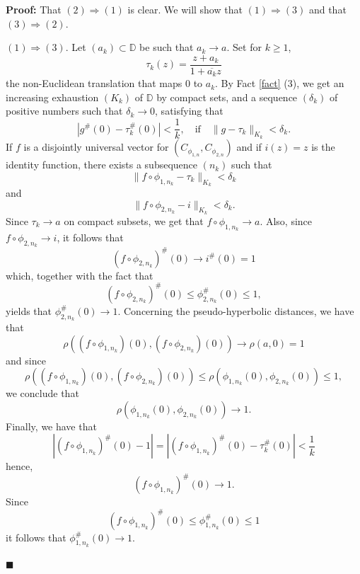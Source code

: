 \documentclass[12pt,a4paper]{amsart}
\theoremstyle{plain}
\theoremstyle{definition}
\theoremstyle{remark}
\theoremstyle{fact}
\newenvironment{pf}
{\noindent\textbf{Proof:}}
{\hfill $\blacksquare$\par\medskip}
\begin{document}
   
    \begin{pf}
        That $(2)\Rightarrow (1)$ is clear. We will show that $(1)\Rightarrow (3)$ and that $(3)\Rightarrow (2)$.

        $(1) \Rightarrow (3)$. Let $(a_k)\subset \mathbb{D}$ be such that $a_k\rightarrow a$. Set for $k\geq 1$,
        $$
        \tau_k(z)=\frac{z+a_k}{1+\overline{a_k}z}
        $$
        the non-Euclidean translation that maps $0$ to $a_k$. By Fact \ref{fact} (3), we get an increasing exhaustion $(K_k)$ of $\mathbb{D}$ by compact sets, and a sequence $(\delta_k)$ of positive numbers such that $\delta_k\rightarrow 0$, satisfying that
        $$
        |g^\#(0)-\tau_k^\#(0)|<\frac{1}{k}, \quad \text{if} \quad \|g-\tau_k\|_{K_k}<\delta_k.
        $$
        If $f$ is a disjointly universal vector for $(C_{\phi_{1, n}},C_{\phi_{2, n}})$ and if $i(z)=z$ is the identity function, there exists a subsequence $(n_k)$ such that
        $$
        \|f\circ \phi_{1, n_k}-\tau_k\|_{K_k}<\delta_k
        $$
        and
        $$
        \|f\circ \phi_{2, n_k}-i\|_{K_k}<\delta_k.
        $$
        Since $\tau_k\rightarrow a$ on compact subsets, we get that $f\circ \phi_{1, n_k}\rightarrow a$. Also, since $f\circ \phi_{2, n_k}\rightarrow i$, it follows that 
        $$
        (f\circ \phi_{2, n_k})^\#(0)\rightarrow i^\#(0)=1
        $$ 
        which, together with the fact that 
        $$
        (f\circ \phi_{2, n_k})^\#(0)\leq \phi_{2, n_k}^\#(0)\leq 1,
        $$ 
        yields that $\phi_{2, n_k}^\#(0)\rightarrow 1$.
        Concerning the pseudo-hyperbolic distances, we have that
        $$
        \rho((f\circ \phi_{1, n_k})(0),(f\circ \phi_{2, n_k})(0))\rightarrow \rho(a,0)=1
        $$
        and since
        $$
        \rho((f\circ \phi_{1, n_k})(0),(f\circ \phi_{2, n_k})(0))\leq \rho(\phi_{1, n_k}(0),\phi_{2, n_k}(0))\leq 1,
        $$
        we conclude that 
        $$
        \rho(\phi_{1, n_k}(0),\phi_{2, n_k}(0))\rightarrow 1.
        $$
        Finally, we have that
        $$
        |(f\circ \phi_{1, n_k})^\#(0)-1|=|(f\circ \phi_{1, n_k})^\#(0)-\tau_k^\#(0)|<\frac{1}{k}
        $$
        hence, 
        $$
        (f\circ \phi_{1, n_k})^\#(0)\rightarrow 1.
        $$
        Since
        $$
        (f\circ \phi_{1, n_k})^\#(0)\leq \phi_{1, n_k}^\#(0)\leq 1
        $$
        it follows that $\phi_{1, n_k}^\#(0)\rightarrow 1$.
        


\end{pf}
\end{document}
